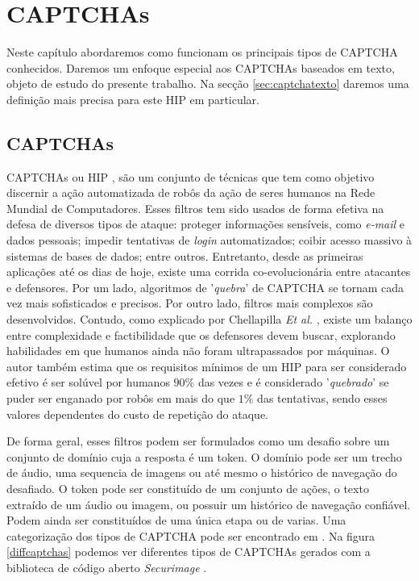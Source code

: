 \chapter{CAPTCHAs}\label{cap:captchas}

Neste capítulo abordaremos como funcionam os principais tipos de CAPTCHA conhecidos. Daremos um enfoque especial aos CAPTCHAs baseados em texto, objeto de estudo do presente trabalho. Na secção \ref{sec:captchatexto} daremos uma definição mais precisa para este HIP em particular.

\section{CAPTCHAs}\label{sec:captchas}

CAPTCHAs \cite{captcha2003} ou HIP \cite{lectures2005HIP}, são um conjunto de técnicas que tem como objetivo discernir a ação automatizada de robôs da ação de seres humanos na Rede Mundial de Computadores. Esses filtros tem sido usados de forma efetiva na defesa de diversos tipos de ataque: proteger informações sensíveis, como \textit{e-mail} e dados pessoais; impedir tentativas de \textit{login} automatizados; coibir acesso massivo à sistemas de bases de dados; entre outros. Entretanto, desde as primeiras aplicações até os dias de hoje, existe uma corrida co-evolucionária entre atacantes e defensores. Por um lado, algoritmos de '\textit{quebra}' de CAPTCHA se  tornam cada vez mais sofisticados e precisos. Por outro lado, filtros mais complexos são desenvolvidos. Contudo, como explicado por Chellapilla \textit{Et al.} \cite{lectures2005HIP}, existe um balanço entre complexidade e factibilidade que os defensores devem buscar, explorando habilidades em que humanos ainda não foram ultrapassados por máquinas. O autor também estima que os requisitos mínimos de um HIP para ser considerado efetivo é ser solúvel por humanos $90\%$ das vezes e é considerado '\textit{quebrado}' se puder ser enganado por robôs em mais do que $1\%$ das tentativas, sendo esses valores dependentes do custo de repetição do ataque.

De forma geral, esses filtros podem ser formulados como um desafio sobre um conjunto de domínio cuja a resposta é um token. O domínio pode ser um trecho de áudio, uma sequencia de imagens ou até mesmo o histórico de navegação do desafiado. O token pode ser constituído de um conjunto de ações, o texto extraído de um áudio ou imagem, ou possuir um histórico de navegação confiável. Podem ainda ser constituídos de uma única etapa ou de varias. Uma categorização dos tipos de CAPTCHA pode ser encontrado em \cite{singh2014survey}. Na figura \ref{diffcaptchas} podemos ver diferentes tipos de CAPTCHAs gerados com a biblioteca de código aberto \textit{Securimage} \cite{securimage}.

